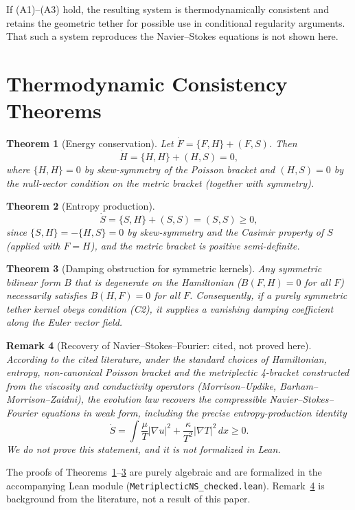 \documentclass[11pt,a4paper]{article}
\newtheorem{theorem}{Theorem}[section]
\newtheorem{remark}[theorem]{Remark}
\begin{document}
If (A1)--(A3) hold, the resulting system is thermodynamically consistent and retains the geometric tether for possible use in conditional regularity arguments. That such a system reproduces the Navier--Stokes equations is not shown here.

\section{Thermodynamic Consistency Theorems}
\begin{theorem}[Energy conservation]
\label{thm:energy}
Let \(\dot F = \{F,H\} + (F,S)\). Then
\[
\dot H = \{H,H\} + (H,S) = 0,
\]
where \(\{H,H\}=0\) by skew-symmetry of the Poisson bracket and \((H,S)=0\) by the null-vector condition on the metric bracket (together with symmetry).
\end{theorem}

\begin{theorem}[Entropy production]
\label{thm:entropy}
\[
\dot S = \{S,H\} + (S,S) = (S,S) \ge 0,
\]
since \(\{S,H\}=-\{H,S\}=0\) by skew-symmetry and the Casimir property of \(S\) (applied with \(F=H\)), and the metric bracket is positive semi-definite.
\end{theorem}

\begin{theorem}[Damping obstruction for symmetric kernels]
\label{thm:obstruction}
Any symmetric bilinear form \(B\) that is degenerate on the Hamiltonian (\(B(F,H)=0\) for all \(F\)) necessarily satisfies \(B(H,F)=0\) for all \(F\). Consequently, if a purely symmetric tether kernel obeys condition (C2), it supplies a vanishing damping coefficient along the Euler vector field.
\end{theorem}

\begin{remark}[Recovery of Navier--Stokes--Fourier: cited, not proved here]
\label{thm:recovery}
According to the cited literature, under the standard choices of Hamiltonian, entropy, non-canonical Poisson bracket and the metriplectic 4-bracket constructed from the viscosity and conductivity operators (Morrison--Updike, Barham--Morrison--Zaidni), the evolution law recovers the compressible Navier--Stokes--Fourier equations in weak form, including the precise entropy-production identity
\[
\dot S = \int\frac{\mu}{T}|\nabla u|^2 + \frac{\kappa}{T^2}|\nabla T|^2\,dx \ge 0.
\]
We do not prove this statement, and it is not formalized in Lean.
\end{remark}

The proofs of Theorems~\ref{thm:energy}--\ref{thm:obstruction} are purely algebraic and are formalized in the accompanying Lean module (\texttt{MetriplecticNS\_checked.lean}). Remark~\ref{thm:recovery} is background from the literature, not a result of this paper.
\end{document}
